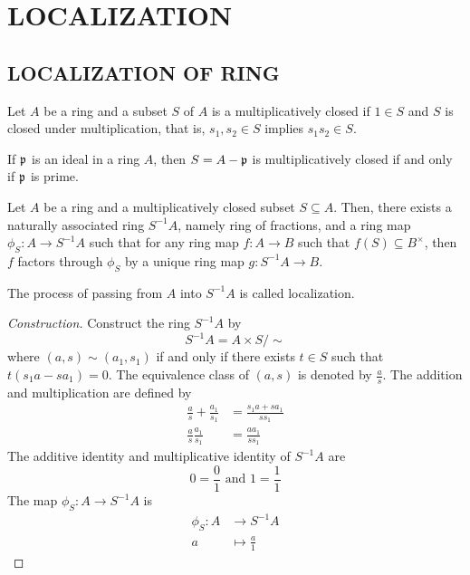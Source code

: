 \chapter{LOCALIZATION}

\section{LOCALIZATION OF RING}

\begin{definition}
	Let $A$ be a ring and a subset $S$ of $A$ is a multiplicatively closed if $1 \in S$ and $S$ is closed under multiplication, that is, $s_1, s_2 \in S$ implies $s_1 s_2 \in S$.
\end{definition}

\begin{remark}
	If $\mathfrak{p}$ is an ideal in a ring $A$, then $S = A - \mathfrak{p}$ is multiplicatively closed if and only if $\mathfrak{p}$ is prime.
\end{remark}

\begin{theorem}
	Let $A$ be a ring and a multiplicatively closed subset $S \subseteq A$. Then, there exists a naturally associated ring $S^{-1} A$, namely ring of fractions, and a ring map $\phi_S: A \to S^{-1} A$ such that for any ring map $f: A \to B$ such that $f(S) \subseteq B^{\times}$, then $f$ factors through $\phi_S$ by a unique ring map $g: S^{-1} A \to B$.
	\begin{center}
	\end{center}
	
	The process of passing from $A$ into $S^{-1} A$ is called localization.
\end{theorem}

\begin{proof}[Construction]
	Construct the ring $S^{-1} A$ by
	$$
		S^{-1} A = A \times S / \sim
	$$ 
	where $(a, s) \sim (a_1, s_1)$ if and only if there exists $t \in S$ such that $t(s_1 a - s a_1) = 0$. The equivalence class of $(a, s)$ is denoted by $\frac{a}{s}$. The addition and multiplication are defined by
	\begin{align*}
		\frac{a}{s} + \frac{a_1}{s_1} &= \frac{s_1 a + s a_1}{s s_1} \\
		\frac{a}{s} \frac{a_1}{s_1} &= \frac{a a_1}{s s_1}
	\end{align*}
	The additive identity and multiplicative identity of $S^{-1} A$ are
	$$
		0 = \frac{0}{1} \text{ and } 1 = \frac{1}{1}
	$$
	The map $\phi_S: A \to S^{-1} A$ is 
	\begin{align*}
		\phi_S: A &\to S^{-1} A \\
				a &\mapsto \frac{a}{1}
	\end{align*}
\end{proof}

